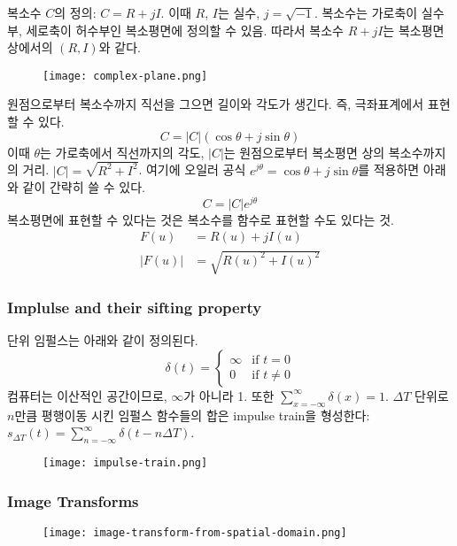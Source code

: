 복소수 $C$의 정의: $C = R + jI$. 이때 $R$, $I$는 실수, $j = \sqrt{-1}$. 복소수는 가로축이 실수부, 세로축이 허수부인 복소평면에 정의할 수 있음. 따라서 복소수 $R + jI$는 복소평면 상에서의 $(R, I)$와 같다.

\begin{figure}[h]
  \centering
  \texttt{[image: complex-plane.png]}
\end{figure}

원점으로부터 복소수까지 직선을 그으면 길이와 각도가 생긴다. 즉, 극좌표계에서 표현할 수 있다.
$$C = |C|(\cos \theta + j \sin \theta)$$
이때 $\theta$는 가로축에서 직선까지의 각도, $|C|$는 원점으로부터 복소평면 상의 복소수까지의 거리. $|C| = \sqrt{R^2 + I^2}$. 여기에 오일러 공식 $e^{j \theta} = \cos \theta + j \sin \theta$를 적용하면 아래와 같이 간략히 쓸 수 있다.
$$C = |C|e^{j \theta}$$
복소평면에 표현할 수 있다는 것은 복소수를 함수로 표현할 수도 있다는 것.
$$
\begin{aligned}
  F(u) &= R(u) + jI(u) \\
  |F(u)| &= \sqrt{R(u)^2 + I(u)^2}
\end{aligned}
$$

\subsubsection{Implulse and their sifting property}

단위 임펄스는 아래와 같이 정의된다.
$$
\delta(t) =
\begin{cases}
  \infty & \text{if } t = 0 \\
  0 & \text{if } t \neq 0
\end{cases}
$$
컴퓨터는 이산적인 공간이므로, $\infty$가 아니라 1. 또한 $\sum_{x=-\infty}^{\infty} \delta(x) = 1$. $\Delta T$ 단위로 $n$만큼 평행이동 시킨 임펄스 함수들의 합은 impulse train을 형성한다: $s_{\Delta T}(t) = \sum_{n=-\infty}^\infty \delta(t - n\Delta T)$.

\begin{figure}[h]
  \centering
  \texttt{[image: impulse-train.png]}
\end{figure}

\subsubsection{Image Transforms}

\begin{figure}[h]
  \centering
  \texttt{[image: image-transform-from-spatial-domain.png]}
\end{figure}

